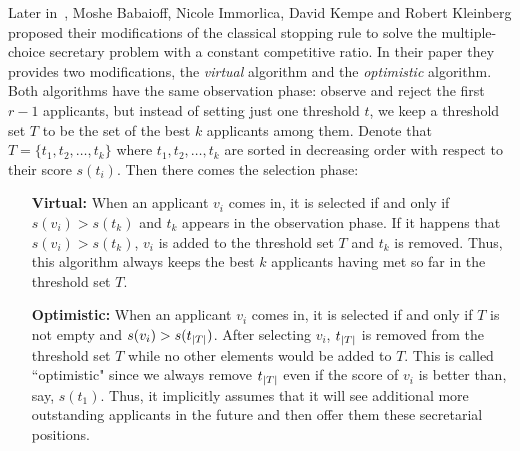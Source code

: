 Later in~\cite{babaioff2007knapsack}, Moshe Babaioff, Nicole Immorlica,
David Kempe and Robert Kleinberg proposed their modifications of the 
classical stopping rule to solve the multiple-choice secretary problem
with a constant competitive ratio.
In their paper they provides two modifications, the \emph{virtual} algorithm
and the \emph{optimistic} algorithm. Both algorithms have the same
observation phase: observe and reject the first $r - 1$ applicants, but
instead of setting just one threshold $t$, we keep a threshold set $T$ to
be the set of the best $k$ applicants among them.
Denote that $T = \{t_1, t_2, \dots, t_{k}\}$ where 
$t_1, t_2, \dots, t_{k}$ are sorted in decreasing order with respect
to their score $s(t_i)$. Then there comes the selection phase:
\begin{itemize}
    \item[{\bf Virtual:} ]
        When an applicant $v_i$ comes in, it is selected if and only if
        $s(v_i) > s(t_{k})$ and $t_{k}$ appears in the
        observation phase. If it happens that $s(v_i) > s(t_{k})$,
        $v_i$ is added to the threshold set $T$ and $t_{k}$ is
        removed. Thus, this algorithm always keeps the best $k$ applicants
        having met so far in the threshold set $T$.
    \item[{\bf Optimistic:} ]
        When an applicant $v_i$ comes in, it is selected if and only if
        $T$ is not empty and $s(v_i) > s(t_{\left\vert T\right\vert})$. After selecting
        $v_i$, $t_{\left\vert T\right\vert}$ is removed from the threshold set $T$ while
        no other elements would be added to $T$. This is called
        ``optimistic" since we always remove $t_{\left\vert T\right\vert}$ even if the score
        of $v_i$ is better than, say, $s(t_1)$. Thus, it implicitly assumes
        that it will see additional more outstanding applicants in the
        future and then offer them these secretarial positions.
\end{itemize}


